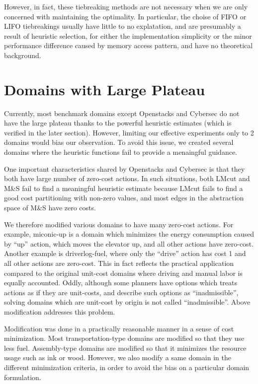 However, in fact, these tiebreaking methods are not necessary when we
are only concerned with maintaining the optimality. In particular, the
choise of FIFO or LIFO tiebreakings usually have little to no
explatation, and are presumably a result of heuristic selection, for
either the implementation simplicity or the minor performance difference
caused by memory access pattern, and have no theoretical background.


\section{Domains with Large Plateau}

Currently, most benchmark domains except Openstacks and Cybersec do not
have the large plateau thanks to the powerful heuristic estimates (which
is verified in the later section). However, limiting our effective
experiments only to 2 domains would bias our observation. To avoid this
issue, we created several domains where the \sota heuristic functions
fail to provide a menaingful guidance.

One important characteristics shared by Openstacks and Cybersec is that they both
have large number of zero-cost actions. In such situations, both LMcut
and M\&S fail to find a meaningful heuristic estimate because LMcut fails to
find a good cost partitioning with non-zero values, and most edges in the abstraction space of
M\&S have zero costs.

We therefore modified various domains to have many zero-cost actions.
For example, miconic-up is a domain which minimizes the energy
consumption caused by ``up'' action, which moves the elevator up, and
all other actions have zero-cost. Another example is driverlog-fuel, where only
the ``drive'' action has cost 1 and all other actions are zero-cost.
This in fact reflects the practical application compared to the original
unit-cost domains where driving and manual labor is equally accounted.
Oddly, although some planners have options which treats actions as if
they are unit-costs, and describe such options as ``inadmissible'',
solving domains which are unit-cost by origin is not called
``inadmissible''. Above modification addresses this problem.

Modification was done in a practically reasonable manner in a sense of
cost minimization. Most transportation-type domains are modified so that
they use less fuel. Assembly-type domains are modified so that it
minimizes the resource usage such as ink or wood. However, we also
modify a same domain in the different minimization criteria, in order to
avoid the bias on a particular domain formulation.


